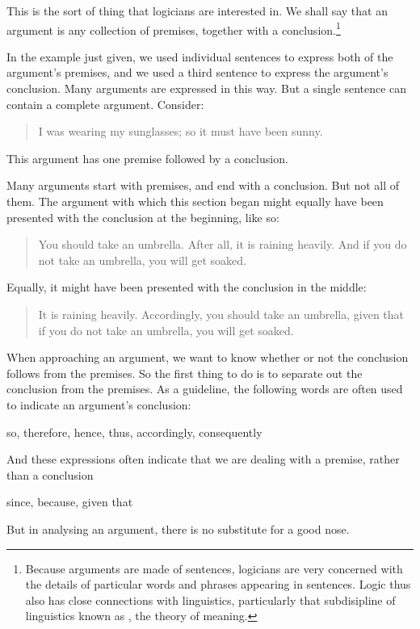 This is the sort of thing that logicians are interested in. We shall say that an argument is any collection of premises, together with a conclusion.\footnote{Because arguments are made of sentences, logicians are very concerned with the details of particular words and phrases appearing in sentences. Logic thus also has close connections with linguistics, particularly that subdisipline of linguistics known as , the theory of meaning.}

In the example just given, we used individual sentences to express both of the argument's premises, and we used a third sentence to express the argument's conclusion. Many arguments are expressed in this way. But a single sentence can contain a complete argument. Consider:
	\begin{quote}
		 I was wearing my sunglasses; so it must have been sunny.
	\end{quote}
This argument has one premise followed by a conclusion. 

Many arguments start with premises, and end with a conclusion. But not all of them. The argument with which this section began might equally have been presented with the conclusion at the beginning, like so:
	\begin{quote}
		You should take an umbrella. After all, it is raining heavily. And if you do not take an umbrella, you will get soaked. 
	\end{quote}
Equally, it might have been presented with the conclusion in the middle:
	\begin{quote}
		It is raining heavily. Accordingly, you should take an umbrella, given that if you do not take an umbrella, you will get soaked.
	\end{quote}
When approaching an argument, we want to know whether or not the conclusion follows from the premises. So the first thing to do is to separate out the conclusion from the premises. As a guideline, the following words are often used to indicate an argument's conclusion:
	\begin{center}
		so, therefore, hence, thus, accordingly, consequently
	\end{center}
And these expressions often indicate that we are dealing with a premise, rather than a conclusion
	\begin{center}
		since, because, given that
	\end{center}
But in analysing an argument, there is no substitute for a good nose.





